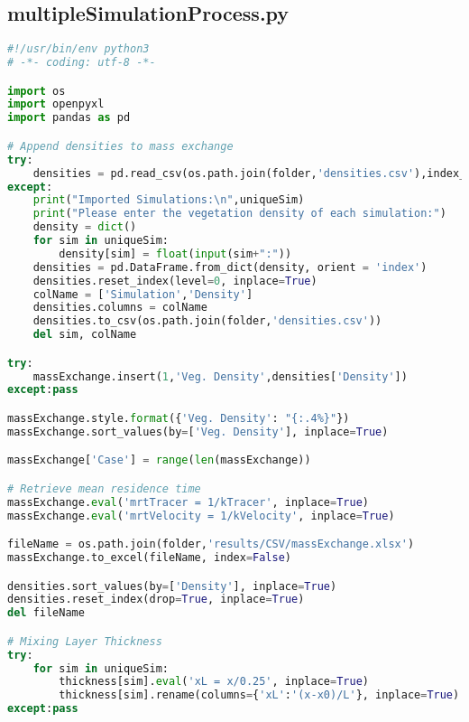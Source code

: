 \subsection{multipleSimulationProcess.py}
\begin{lstlisting}[language=python]
#!/usr/bin/env python3
# -*- coding: utf-8 -*-

import os
import openpyxl
import pandas as pd

# Append densities to mass exchange
try:
    densities = pd.read_csv(os.path.join(folder,'densities.csv'),index_col=0)
except:
    print("Imported Simulations:\n",uniqueSim)
    print("Please enter the vegetation density of each simulation:")
    density = dict()
    for sim in uniqueSim:
        density[sim] = float(input(sim+":"))
    densities = pd.DataFrame.from_dict(density, orient = 'index')
    densities.reset_index(level=0, inplace=True)
    colName = ['Simulation','Density']
    densities.columns = colName
    densities.to_csv(os.path.join(folder,'densities.csv'))
    del sim, colName

try:
    massExchange.insert(1,'Veg. Density',densities['Density'])
except:pass

massExchange.style.format({'Veg. Density': "{:.4%}"})
massExchange.sort_values(by=['Veg. Density'], inplace=True)

massExchange['Case'] = range(len(massExchange))

# Retrieve mean residence time
massExchange.eval('mrtTracer = 1/kTracer', inplace=True)
massExchange.eval('mrtVelocity = 1/kVelocity', inplace=True)

fileName = os.path.join(folder,'results/CSV/massExchange.xlsx')
massExchange.to_excel(fileName, index=False)

densities.sort_values(by=['Density'], inplace=True)
densities.reset_index(drop=True, inplace=True)
del fileName

# Mixing Layer Thickness
try:
    for sim in uniqueSim:
        thickness[sim].eval('xL = x/0.25', inplace=True)
        thickness[sim].rename(columns={'xL':'(x-x0)/L'}, inplace=True)
except:pass

\end{lstlisting}
